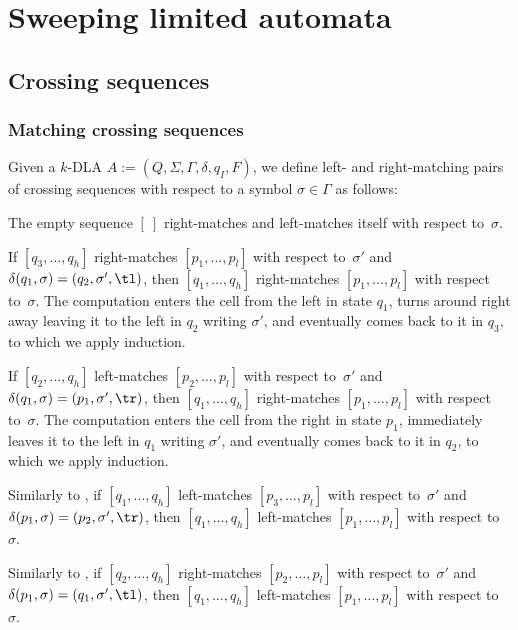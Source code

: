 \chapter{Sweeping limited automata}



\section{Crossing sequences}


\subsection{Matching crossing sequences}
\begin{defn}
	Given a $k$-DLA $A:=(Q,\Sigma,\Gamma,\delta,q_I,F)$, we define left- and right-matching pairs of crossing sequences with respect to a symbol $\sigma\in\Gamma$ as follows:
	\begin{rules}
		\item \label{itm:crossmatchswepDLA-1} The empty sequence $[~]$ right-matches and left-matches itself with respect to~$\sigma$.
		\item \label{itm:crossmatchswepDLA-2} If $[q_3,\dots,q_h]$ right-matches $[p_1,\dots,p_l]$ with respect to~$\sigma'$ and $\delta(q_1,\sigma)=(q_2,\sigma',\tl)$, then $[q_1,\dots,q_h]$ right-matches $[p_1,\dots,p_l]$ with respect to~$\sigma$.
		The computation enters the cell from the left in state $q_1$, turns around right away leaving it to the left in $q_2$ writing $\sigma'$, and eventually comes back to it in $q_3$, to which we apply induction.
		\item \label{itm:crossmatchswepDLA-3} If $[q_2,\dots,q_h]$ left-matches $[p_2,\dots,p_l]$ with respect to~$\sigma'$ and $\delta(q_1,\sigma)=(p_1,\sigma',\tr)$, then $[q_1,\dots,q_h]$ right-matches $[p_1,\dots,p_l]$ with respect to~$\sigma$.
		The computation enters the cell from the right in state $p_1$, immediately leaves it to the left in $q_1$ writing $\sigma'$, and eventually comes back to it in $q_2$, to which we apply induction.
		\item \label{itm:crossmatchswepDLA-4} Similarly to , if $[q_1,\dots,q_h]$ left-matches $[p_3,\dots,p_l]$ with respect to~$\sigma'$ and $\delta(p_1,\sigma)=(p_2,\sigma',\tr)$, then $[q_1,\dots,q_h]$ left-matches $[p_1,\dots,p_l]$ with respect to~$\sigma$.
		\item \label{itm:crossmatchswepDLA-5} Similarly to , if $[q_2,\dots,q_h]$ right-matches $[p_2,\dots,p_l]$ with respect to~$\sigma'$ and $\delta(p_1,\sigma)=(q_1,\sigma',\tl)$, then $[q_1,\dots,q_h]$ left-matches $[p_1,\dots,p_l]$ with respect to~$\sigma$.
	\end{rules}
\end{defn}

